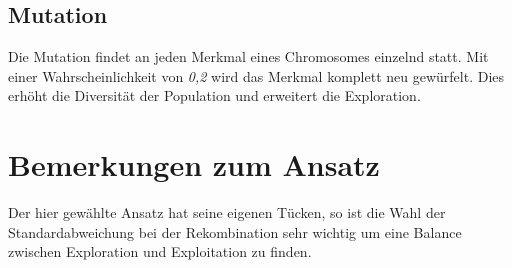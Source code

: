 \subsection{Mutation}
Die Mutation findet an jeden Merkmal eines Chromosomes einzelnd statt. Mit einer Wahrscheinlichkeit von \textit{0,2} wird das Merkmal komplett neu gewürfelt. Dies erhöht die Diversität der Population und erweitert die Exploration.
\section{Bemerkungen zum Ansatz}
Der hier gewählte Ansatz hat seine eigenen Tücken, so ist die Wahl der Standardabweichung bei der Rekombination sehr wichtig um eine Balance zwischen Exploration und Exploitation zu finden. 